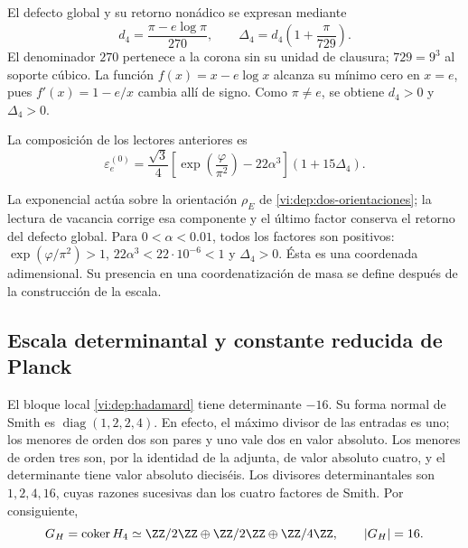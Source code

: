 El defecto global y su retorno nonádico se expresan mediante
\begin{equation}
 d_4=\frac{\pi-e\log\pi}{270},\qquad
 \Delta_4=d_4\left(1+\frac{\pi}{729}\right).
 \label{vi:dep:delta4}
\end{equation}
El denominador \(270\) pertenece a la corona sin su unidad de
clausura; \(729=9^3\) al soporte cúbico. La función
\(f(x)=x-e\log x\) alcanza su mínimo cero en \(x=e\), pues
\(f'(x)=1-e/x\) cambia allí de signo. Como \(\pi\ne e\),
se obtiene \(d_4>0\) y \(\Delta_4>0\).

\begin{definition}
\label{vi:dep:electron-basal}
La composición de los lectores anteriores es
\begin{equation}
 \varepsilon_e^{(0)}=
 \frac{\sqrt3}{4}
 \left[\exp\left(\frac{\varphi}{\pi^2}\right)-22\alpha^3\right]
 (1+15\Delta_4).
 \label{vi:dep:formula-basal}
\end{equation}
\end{definition}
La exponencial actúa sobre la orientación \(\rho_E\) de
\eqref{vi:dep:dos-orientaciones}; la lectura de vacancia corrige esa
componente y el último factor conserva el retorno del defecto global.
Para \(0<\alpha<0.01\), todos los factores son positivos:
\(\exp(\varphi/\pi^2)>1\), \(22\alpha^3<22\cdot10^{-6}<1\)
y \(\Delta_4>0\). Ésta es una coordenada adimensional. Su presencia
en una coordenatización de masa se define después de la construcción de la escala.

\subsection{Escala determinantal y constante reducida de Planck}
\label{vi:dep:planck}

El bloque local \eqref{vi:dep:hadamard} tiene determinante \(-16\).
Su forma normal de Smith es \(\operatorname{diag}(1,2,2,4)\).
En efecto, el máximo divisor de las entradas es uno; los menores de
orden dos son pares y uno vale dos en valor absoluto. Los menores de
orden tres son, por la identidad de la adjunta, de valor absoluto cuatro,
y el determinante tiene valor absoluto dieciséis. Los divisores
determinantales son \(1,2,4,16\), cuyas razones sucesivas dan los
cuatro factores de Smith. Por consiguiente,
\begin{equation}
 G_H=\operatorname{coker}H_4
 \simeq\ZZ/2\ZZ\oplus\ZZ/2\ZZ\oplus\ZZ/4\ZZ,
 \qquad |G_H|=16.
 \label{vi:dep:conucleo}
\end{equation}

